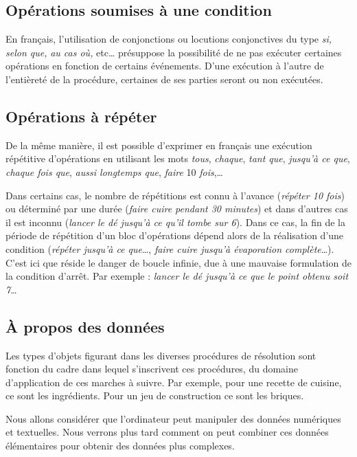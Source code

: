 	\subsection{Opérations soumises à une condition}

		En français, l’utilisation de conjonctions ou locutions conjonctives du
		type \textit{si}\textit{, selon que, }\textit{au cas où, }etc…
		présuppose la possibilité de ne pas exécuter certaines opérations en
		fonction de certains événements. D’une exécution à l’autre de
		l’entièreté de la procédure, certaines de ses parties seront ou non
		exécutées.

	\subsection{Opérations à répéter}

		De la même manière, il est possible d’exprimer en français une exécution
		répétitive d’opérations en utilisant les mots \textit{tous},
		\textit{chaque}, \textit{tant que}, \textit{jusqu’à ce que},
		\textit{chaque fois que}, \textit{aussi longtemps que}, \textit{faire}
		10\textit{ fois},\dots 
		
		Dans certains cas, le nombre de répétitions est connu à l’avance
		(\textit{répéter 10 fois}) ou déterminé par une durée (\textit{faire
		cuire pendant 30 minutes}) et dans d’autres cas il est inconnu
		(\textit{lancer le dé jusqu'à ce
		qu'il tombe sur 6}). Dans ce cas, la fin de la période
		de répétition d’un bloc d’opérations dépend alors de la réalisation
		d’une condition (\textit{répéter jusqu’à ce que}…, \textit{faire cuire
		jusqu’à évaporation complète}…). C’est ici que réside le danger de
		boucle infinie, due à une mauvaise formulation de la condition d’arrêt.
		Par exemple : \textit{lancer le dé jusqu’à ce que le point obtenu soit
		7}\dots

	\subsection{À propos des données}

		Les types d’objets figurant dans les diverses procédures de résolution
		sont fonction du cadre dans lequel s’inscrivent ces procédures, du
		domaine d’application de ces marches à suivre. Par exemple, pour une
		recette de cuisine, ce sont les ingrédients. Pour un jeu de
		construction ce sont les briques.
		
		Nous allons considérer que l'ordinateur peut manipuler
		des données numériques et textuelles. Nous verrons plus tard comment on
		peut combiner ces données élémentaires pour obtenir des données plus
		complexes.

